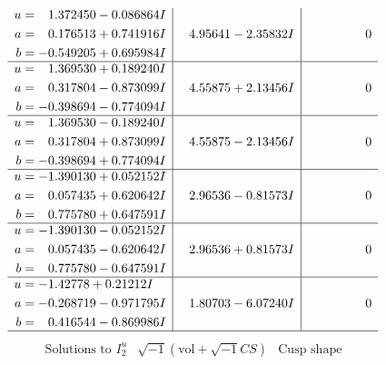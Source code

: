 \documentclass[1p]{elsarticle_modified}
\theoremstyle{definition}
\newcommand{\I}{\sqrt{-1}}
\begin{document}
$$\begin{array}{c|c|c}
\begin{aligned}
u &= \phantom{-}1.372450 - 0.086864 I \\
a &= \phantom{-}0.176513 + 0.741916 I \\
b &= -0.549205 + 0.695984 I\end{aligned}
 & \phantom{-}4.95641 - 2.35832 I & \phantom{-0.000000 } 0 \\ \hline\begin{aligned}
u &= \phantom{-}1.369530 + 0.189240 I \\
a &= \phantom{-}0.317804 - 0.873099 I \\
b &= -0.398694 - 0.774094 I\end{aligned}
 & \phantom{-}4.55875 + 2.13456 I & \phantom{-0.000000 } 0 \\ \hline\begin{aligned}
u &= \phantom{-}1.369530 - 0.189240 I \\
a &= \phantom{-}0.317804 + 0.873099 I \\
b &= -0.398694 + 0.774094 I\end{aligned}
 & \phantom{-}4.55875 - 2.13456 I & \phantom{-0.000000 } 0 \\ \hline\begin{aligned}
u &= -1.390130 + 0.052152 I \\
a &= \phantom{-}0.057435 + 0.620642 I \\
b &= \phantom{-}0.775780 + 0.647591 I\end{aligned}
 & \phantom{-}2.96536 - 0.81573 I & \phantom{-0.000000 } 0 \\ \hline\begin{aligned}
u &= -1.390130 - 0.052152 I \\
a &= \phantom{-}0.057435 - 0.620642 I \\
b &= \phantom{-}0.775780 - 0.647591 I\end{aligned}
 & \phantom{-}2.96536 + 0.81573 I & \phantom{-0.000000 } 0 \\ \hline\begin{aligned}
u &= -1.42778 + 0.21212 I \\
a &= -0.268719 - 0.971795 I \\
b &= \phantom{-}0.416544 - 0.869986 I\end{aligned}
 & \phantom{-}1.80703 - 6.07240 I & \phantom{-0.000000 } 0\\
 \hline 
 \end{array}$$\newpage$$\begin{array}{c|c|c}  
\text{Solutions to }I^u_{2}& \I (\text{vol} + \sqrt{-1}CS) & \text{Cusp shape}\\

\end{array}$$
\end{document}
